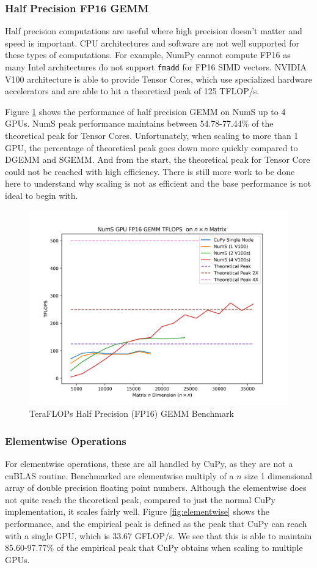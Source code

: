\documentclass{article}
\begin{document}
\subsubsection{Half Precision FP16 GEMM}
Half precision computations are useful where high precision doesn't matter and speed is important. CPU architectures and software are not well supported for these types of computations. For example, NumPy cannot compute FP16 as many Intel architectures do not support \verb|fmadd| for FP16 SIMD vectors. NVIDIA V100 architecture is able to provide Tensor Cores, which use specialized hardware accelerators and are able to hit a theoretical peak of 125 TFLOP/s.

Figure \ref{fig:fp16gemm} shows the performance of half precision GEMM on NumS up to 4 GPUs. NumS peak performance maintains between 54.78-77.44\% of the theoretical peak for Tensor Cores. Unfortunately, when scaling to more than 1 GPU, the percentage of theoretical peak goes down more quickly compared to DGEMM and SGEMM. And from the start, the theoretical peak for Tensor Core could not be reached with high efficiency. There is still more work to be done here to understand why scaling is not as efficient and the base performance is not ideal to begin with.

\begin{figure}
	\centerline{\includegraphics[width=5in]{figures/NumS_GPU_TFLOPS_FP16GEMM.png}}
	\caption{TeraFLOPs Half Precision (FP16) GEMM Benchmark}
	\label{fig:fp16gemm}
\end{figure}

\subsubsection{Elementwise Operations}
For elementwise operations, these are all handled by CuPy, as they are not a cuBLAS routine. Benchmarked are elementwise multiply of a $n$ size 1 dimensional array of double precision floating point numbers. Although the elementwise does not quite reach the theoretical peak, compared to just the normal CuPy implementation, it scales fairly well. Figure \ref{fig:elementwise} shows the performance, and the empirical peak is defined as the peak that CuPy can reach with a single GPU, which is 33.67 GFLOP/s. We see that this is able to maintain 85.60-97.77\% of the empirical peak that CuPy obtains when scaling to multiple GPUs.
\end{document}

